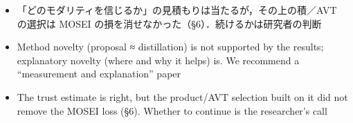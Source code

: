 \begin{frame}{}
{\begin{itemize}
\item 「どのモダリティを信じるか」の見積もりは当たるが，その上の積／AVT の選択は MOSEI の損を消せなかった（\S6）．続けるかは研究者の判断
\end{itemize}
}{%
\begin{itemize}
\item Method novelty (proposal ≈ distillation) is not supported by the results; explanatory novelty (where and why it helps) is. We recommend a ``measurement and explanation'' paper
\item The trust estimate is right, but the product/AVT selection built on it did not remove the MOSEI loss (\S6). Whether to continue is the researcher's call
\end{itemize}
}
\end{frame}
